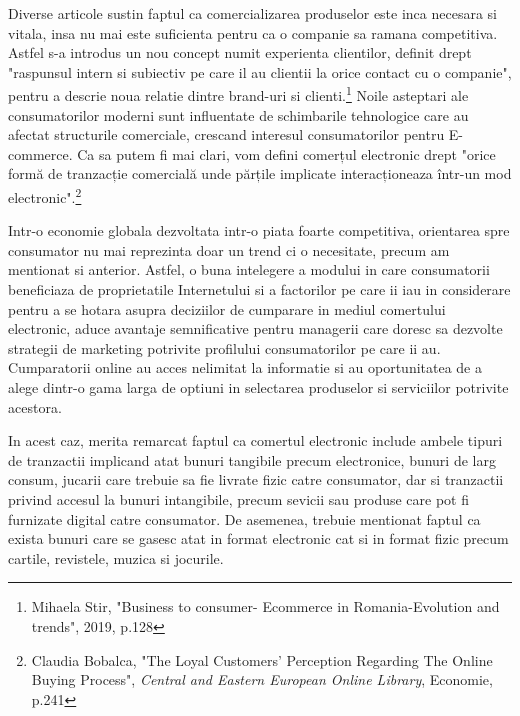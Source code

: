 \documentclass[a4paper, 12pt]{article}
\begin{document}
	\quad Diverse articole sustin faptul ca comercializarea produselor este inca necesara si vitala, insa nu mai este suficienta pentru ca o companie sa ramana competitiva. Astfel s-a introdus un nou concept numit experienta clientilor, definit drept "raspunsul intern si subiectiv pe care il au clientii la orice contact cu o companie", pentru a descrie noua relatie dintre brand-uri si clienti.\footnote{Mihaela Stir, "Business to consumer- Ecommerce in Romania-Evolution and trends", 2019, p.128} Noile asteptari ale consumatorilor moderni sunt influentate de schimbarile tehnologice care au afectat structurile comerciale, crescand interesul consumatorilor pentru E-commerce. Ca sa putem fi mai clari, vom defini comerțul electronic drept "orice formă de tranzacție comercială unde părțile implicate interacționeaza într-un mod electronic".\footnote{Claudia Bobalca, "The Loyal Customers’ Perception Regarding The Online
	Buying Process", \textit{Central and Eastern European Online Library}, Economie, p.241}	
	
	\quad Intr-o economie globala dezvoltata intr-o piata foarte competitiva, orientarea spre consumator nu mai reprezinta doar un trend ci o necesitate, precum am mentionat si anterior. Astfel, o buna intelegere a modului in care consumatorii beneficiaza de proprietatile Internetului si a factorilor pe care ii iau in considerare pentru a se hotara asupra deciziilor de cumparare in mediul comertului electronic, aduce avantaje semnificative pentru managerii care doresc sa dezvolte strategii de marketing potrivite profilului consumatorilor pe care ii au. Cumparatorii online au acces nelimitat la informatie si au oportunitatea de a alege dintr-o gama larga de optiuni in selectarea produselor si serviciilor potrivite acestora.

	\quad In acest caz, merita remarcat faptul ca comertul electronic include ambele tipuri de tranzactii implicand atat bunuri tangibile precum electronice, bunuri de larg consum, jucarii care trebuie sa fie livrate fizic catre consumator, dar si tranzactii privind accesul la bunuri intangibile, precum sevicii sau produse care pot fi furnizate digital catre consumator. De asemenea, trebuie mentionat faptul ca exista bunuri care se gasesc atat in format electronic cat si in format fizic precum cartile, revistele, muzica si jocurile.
\end{document}
